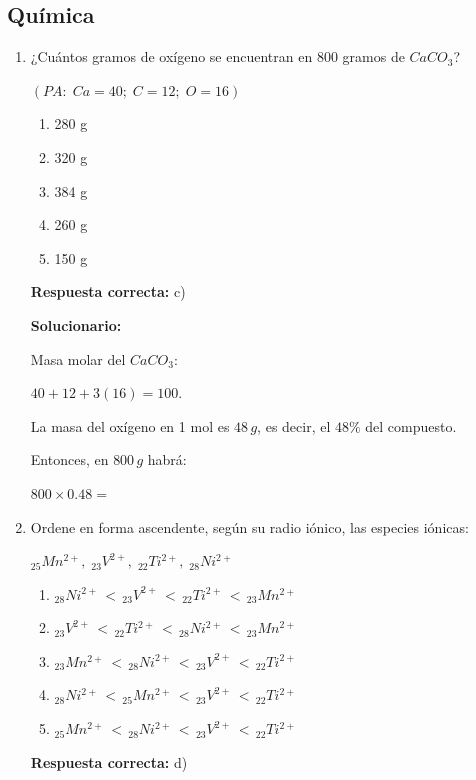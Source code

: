 \subsection*{Química}

\begin{enumerate}[resume]

	\item ¿Cuántos gramos de oxígeno se encuentran en 800 gramos de $CaCO_3$?
	
	$(PA:\; Ca=40;\; C=12;\; O=16)$
	\begin{enumerate}[label=\alph*)]
		\item 280 g
		\item 320 g
		\item 384 g
		\item 260 g
		\item 150 g
	\end{enumerate}
	\textbf{Respuesta correcta:} c)
	
	\vspace{2mm}
	\textbf{Solucionario:}
	
	Masa molar del $CaCO_3$:
	
	$40+12+3(16)=100$.
	
	La masa del oxígeno en 1 mol es $48\,g$, es decir, el $48\%$ del compuesto.
	
	Entonces, en $800\,g$ habrá:
	
	$800\times 0.48=$
	
	\vspace{6mm}
	
	\item Ordene en forma ascendente, según su radio iónico, las especies iónicas:
	
	${}_{25}Mn^{2+},\; {}_{23}V^{2+},\; {}_{22}Ti^{2+},\; {}_{28}Ni^{2+}$
	
	\begin{enumerate}[label=\alph*)]
		\item ${}_{28}Ni^{2+} \,<\, {}_{23}V^{2+} \,<\, {}_{22}Ti^{2+} \,<\, {}_{23}Mn^{2+}$
		\item ${}_{23}V^{2+} \,<\, {}_{22}Ti^{2+} \,<\, {}_{28}Ni^{2+} \,<\, {}_{23}Mn^{2+}$
		\item ${}_{23}Mn^{2+} \,<\, {}_{28}Ni^{2+} \,<\, {}_{23}V^{2+} \,<\, {}_{22}Ti^{2+}$
		\item ${}_{28}Ni^{2+} \,<\, {}_{25}Mn^{2+} \,<\, {}_{23}V^{2+} \,<\, {}_{22}Ti^{2+}$
		\item ${}_{25}Mn^{2+} \,<\, {}_{28}Ni^{2+} \,<\, {}_{23}V^{2+} \,<\, {}_{22}Ti^{2+}$
	\end{enumerate}
	\textbf{Respuesta correcta:} d)
	

\end{enumerate}
